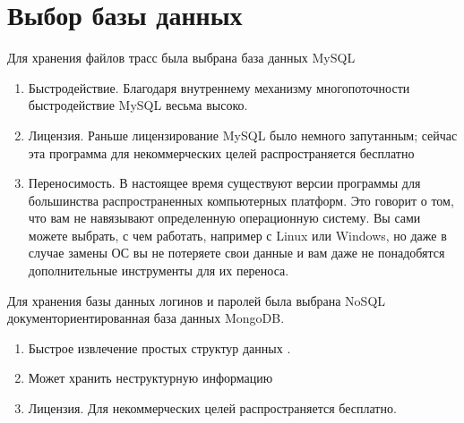\section{Выбор базы данных}
Для хранения файлов трасс была выбрана база данных MySQL
\begin{enumerate}
	\item Быстродействие. Благодаря внутреннему механизму многопоточности быстродействие MySQL весьма высоко.
	\item Лицензия. Раньше лицензирование MySQL было немного запутанным; сейчас эта программа для некоммерческих целей распространяется бесплатно
	\item Переносимость. В настоящее время существуют версии программы для большинства распространенных компьютерных платформ. Это говорит о том, что вам не навязывают определенную операционную систему. Вы сами можете выбрать, с чем работать, например с Linux или Windows, но даже в случае замены ОС вы не потеряете свои данные и вам даже не понадобятся дополнительные инструменты для их переноса.
\end{enumerate}
Для хранения базы данных логинов и паролей была выбрана NoSQL документориентированная база данных MongoDB.
\begin{enumerate}
	\item Быстрое извлечение простых структур данных \cite{book5}.
	\item Может хранить неструктурную информацию
	 \item Лицензия. Для некоммерческих целей распространяется бесплатно.
\end{enumerate}



